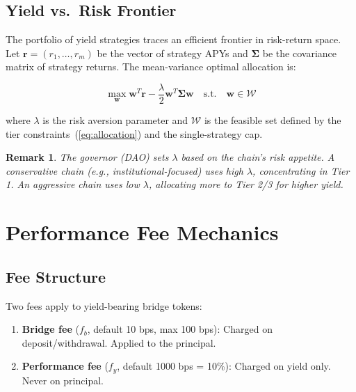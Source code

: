 \documentclass[11pt,twocolumn]{article}
\newtheorem{remark}{Remark}[section]
\begin{document}
\subsection{Yield vs.\ Risk Frontier}

The portfolio of yield strategies traces an efficient frontier in risk-return space. Let $\bm{r} = (r_1, \ldots, r_m)$ be the vector of strategy APYs and $\bm{\Sigma}$ be the covariance matrix of strategy returns. The mean-variance optimal allocation is:

\begin{equation}\label{eq:frontier}
  \max_{\bm{w}} \bm{w}^T \bm{r} - \frac{\lambda}{2} \bm{w}^T \bm{\Sigma} \bm{w}
  \quad \text{s.t.} \quad \bm{w} \in \mathcal{W}
\end{equation}

where $\lambda$ is the risk aversion parameter and $\mathcal{W}$ is the feasible set defined by the tier constraints~(\ref{eq:allocation}) and the single-strategy cap.

\begin{remark}
The governor (DAO) sets $\lambda$ based on the chain's risk appetite. A conservative chain (e.g., institutional-focused) uses high $\lambda$, concentrating in Tier 1. An aggressive chain uses low $\lambda$, allocating more to Tier 2/3 for higher yield.
\end{remark}

\section{Performance Fee Mechanics}\label{sec:fees}

\subsection{Fee Structure}

Two fees apply to yield-bearing bridge tokens:

\begin{enumerate}[nosep]
  \item \textbf{Bridge fee} ($f_b$, default 10 bps, max 100 bps): Charged on deposit/withdrawal. Applied to the principal.
  \item \textbf{Performance fee} ($f_y$, default 1000 bps = 10\%): Charged on yield only. Never on principal.
\end{enumerate}
\end{document}
